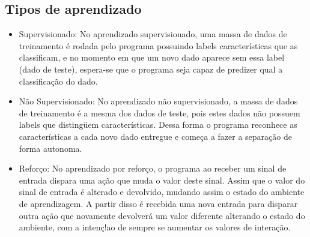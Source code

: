 \subsection{Tipos de aprendizado}
    \begin{itemize}
        \item Supervisionado: No aprendizado supervisionado, uma massa de dados de treinamento é rodada pelo programa possuindo labels características que as classificam, e no momento em que um novo dado aparece sem essa label (dado de teste), espera-se que o programa seja capaz de predizer qual a classificação do dado.
        \item Não Supervisionado: No aprendizado não supervisionado, a massa de dados de treinamento é a mesma dos dados de teste, pois estes dados não possuem labels que distingüem características. Dessa forma o programa reconhece as características a cada novo dado entregue e começa a fazer a separação de forma autonoma. \cite{chao2011}
        \item Reforço: No aprendizado por reforço, o programa ao receber um sinal de entrada dispara uma ação que muda o valor deste sinal. Assim que o valor do sinal de entrada é alterado e devolvido, mudando assim o estado do ambiente de aprendizagem. A partir disso é recebida uma nova entrada para disparar outra ação que novamente devolverá um valor diferente alterando o estado do ambiente, com a intenç!ao de sempre se aumentar os valores de interação. \cite{kaelbling1996}
    \end{itemize}



